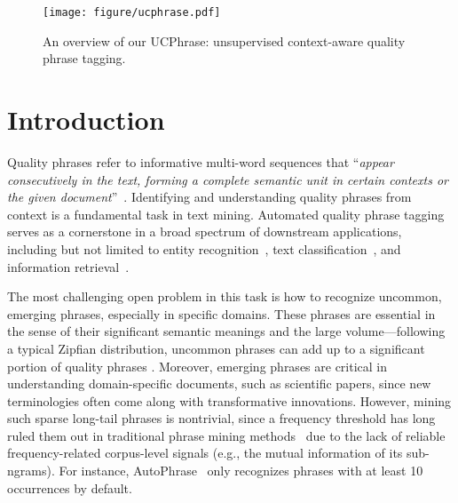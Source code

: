 \documentclass[sigconf]{acmart}
\newcommand{\our}{\mbox{UCPhrase}\xspace}
\begin{document}

\maketitle
\begin{figure*}
    \centering
    \texttt{[image: figure/ucphrase.pdf]}
    \vspace{-1.5em}
    \caption{
    An overview of our \our: unsupervised context-aware quality phrase tagging.
    }\label{fig:pipeline}
    \vspace{-2.5mm}
\end{figure*}

\section{Introduction}

Quality phrases refer to informative multi-word sequences that ``\emph{appear consecutively in the text, forming a complete semantic unit in certain contexts or the given document}''~\cite{finch2016linguistic}.
Identifying and understanding quality phrases from context is a fundamental task in text mining.
Automated quality phrase tagging serves as a cornerstone in a broad spectrum of downstream applications, including but not limited to 
entity recognition~\cite{shang2018learning},
text classification~\cite{altinel2018semantic},
and information retrieval~\cite{croft1991use}.

The most challenging open problem in this task is how to recognize uncommon, emerging phrases, especially in specific domains. 
These phrases are essential in the sense of their significant semantic meanings and the large volume---following a typical Zipfian distribution, uncommon phrases can add up to a significant portion of quality phrases \cite{williams2015zipf}.
Moreover, emerging phrases are critical in understanding domain-specific documents, such as scientific papers, since new terminologies often come along with transformative innovations.
However, mining such sparse long-tail phrases is nontrivial, since a frequency threshold has long ruled them out in traditional phrase mining methods~\cite{deane2005nonparametric,li2017efficiently,el2014scalable,liu2015mining,shang2018automated} due to the lack of reliable frequency-related corpus-level signals (e.g., the mutual information of its sub-ngrams). 
For instance, AutoPhrase~\cite{shang2018automated} only recognizes phrases with at least 10 occurrences by default.
\end{document}

